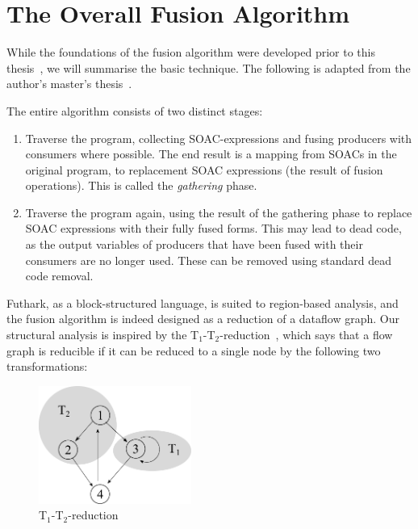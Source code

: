 \section{The Overall Fusion Algorithm}
\label{sec:fusion-algorithm}

While the foundations of the fusion algorithm were developed prior to
this thesis~\cite{henriksen2013t2}, we will summarise the basic
technique.  The following is adapted from the author's master's
thesis~\cite{henriksen2014exploiting}.

The entire algorithm consists of two distinct stages:

\begin{enumerate}
\item Traverse the program, collecting SOAC-expressions and fusing
  producers with consumers where possible.  The end result is a
  mapping from SOACs in the original program, to replacement SOAC
  expressions (the result of fusion operations).  This is called the
  \textit{gathering} phase.

\item Traverse the program again, using the result of the gathering
  phase to replace SOAC expressions with their fully fused forms.
  This may lead to dead code, as the output variables of producers
  that have been fused with their consumers are no longer used.  These
  can be removed using standard dead code removal.
\end{enumerate}

Futhark, as a block-structured language, is suited to region-based
analysis, and the fusion algorithm is indeed designed as a reduction
of a dataflow graph.  Our structural analysis is inspired by the
T$_{1}$-T$_{2}$-reduction~\cite{red_dragon}, which says that a flow
graph is reducible if it can be reduced to a single node by the
following two transformations:

\begin{figure}
\begin{center}
\includegraphics[width=5cm]{img/t1t2-1.pdf}
\end{center}
\caption{T$_{1}$-T$_{2}$-reduction}
\label{fig:t1t2-1}
\end{figure}


